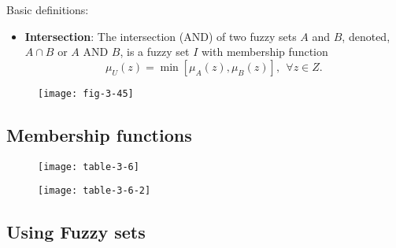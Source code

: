 \begin{frame}
Basic definitions:
\begin{itemize}
\item \textbf{Intersection}: The intersection (AND) of two fuzzy sets $A$ and $B$, denoted, $A \cap B$ or $A$ AND $B$, is a fuzzy set $I$ with membership function
\[
\mu_{U}(z) = \min \left [ \mu_{A}(z), \mu_{B}(z) \right ],\ \ \forall z \in Z.
\]
\end{itemize}
\end{frame}


\begin{frame}
\begin{figure}[!h]
\centering
\texttt{[image: fig-3-45]}
\end{figure}
\end{frame}


\subsection{Membership functions}


\begin{frame}
\begin{figure}[!h]
\centering
\texttt{[image: table-3-6]}
\end{figure}
\end{frame}


\begin{frame}
\begin{figure}[!h]
\centering
\texttt{[image: table-3-6-2]}
\end{figure}
\end{frame}


\subsection{Using Fuzzy sets}

